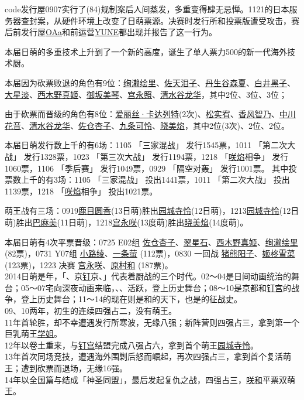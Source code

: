 code发行屋0907实行了(84)规制案后人间蒸发，多重变得肆无忌惮。1121的日本服务器查封案，从硬件环境上改变了日萌票源。决赛时发行所和投票版遭受攻击，赛后前发行屋\uline{OAa}和前运营\uline{YUNE}都出现并报告了这一行为。

本届日萌的多重技术上升到了一个新的高度，诞生了单人票力500的新一代海外技术厨。

本届因为砍票败退的角色有9位：\uline{绚濑绘里}、\uline{佐天泪子}、\uline{丹生谷森夏}、\uline{白井黑子}、\uline{大星淡}、\uline{西木野真姬}、\uline{御坂美琴}、\uline{宫永照}、\uline{清水谷龙华}，其中2位、3位、3位；

由于砍票而晋级的角色有8位：\uline{爱丽丝·卡达列特}(2次)、\uline{松实宥}、\uline{香风智乃}、\uline{中川花音}、\uline{清水谷龙华}、\uline{佐仓杏子}、\uline{九条可怜}、\uline{晓美焰}，其中2位(3次)、2位、2位。

本届日萌发行数上千的有6场：1105 「三家混战」 发行1545票，1011 「第二次大战」 发行1328票，1023 「第三次大战」 发行1194票，1218 「\uline{咲焰}相争」 发行1060票，1106 「季后赛」 发行1049票，0929 「隔空对轰」 发行1001票。
其中投票数上千的有3场：1105 「三家混战」 投出1441票，1011 「第二次大战」 投出1139票，1218 「\uline{咲焰}相争」 投出1021票。

萌王战有三场：0919\uline{鹿目圆香}(13日萌)胜出\uline{园城寺怜}(12日萌)，1213\uline{园城寺怜}(12日萌)胜出\uline{巴麻美}(11日萌)，1218\uline{宫永咲}(13度萌)胜出\uline{晓美焰}(14度萌)。

本届日萌有4次平票晋级：0725 E02组 \uline{佐仓杏子}、\uline{翠星石}、\uline{西木野真姬}、\uline{绚濑绘里} (82票)，0731 Y07组 \uline{小路绫}、\uline{一条萤} (112票)，0830 一回战 \uline{猪熊阳子}、\uline{姬柊雪菜} (123票)，1223 决赛 \uline{宫永咲}、\uline{原村和} (187票)。
\\

2014日萌是年，「、京\uline{钉}京、」代表着厨战的三个时代。02～04是日间动画统治的舞台；05～07宅向深夜动画来临，、、活跃，登上历史舞台；08～10是京都和\uline{钉宫}的战争，登上历史舞台；11～14的现在则是和的天下，也是的征战史。\\
09、10两年，初生的连续四强占二，没有萌王。\\
11年首轮胜，却不幸遭遇发行所寒波，无缘八强；新阵营则四强占三，拿到第一个巨乳萌王\uline{学姐}。\\
12年以卷土重来，与\uline{钉宫}结盟完成八强占六，拿到首个萌王\uline{园城寺怜}。\\
13年首次同场竞技，遭遇海外围剿后怒而崛起，再次四强占三，拿到首个复活萌王；遭到砍票而退场，无缘16强。\\
14年以全国篇与结成「神圣同盟」，最后发起复仇之战，四强占三，\uline{咲}\uline{和}平票双萌王。

